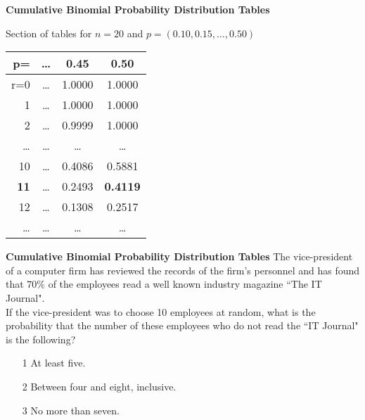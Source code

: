 \documentclass[a4]{beamer}
\begin{document}
{
\textbf{Cumulative Binomial Probability Distribution Tables}

Section of tables for $n=20$ and $p = (0.10,0.15, \ldots, 0.50)$
\begin{center}
\begin{tabular}{|r||c|c|c|}
  \hline
  p= & \ldots & 0.45 & \textbf{0.50} \\ \hline \hline
  r=0 & \ldots & 1.0000 & 1.0000 \\
  1 & \ldots & 1.0000 & 1.0000 \\
  2 & \ldots & 0.9999 & 1.0000 \\
  \ldots & \ldots & \ldots & \ldots \\

  10 & \ldots & 0.4086 & 0.5881 \\
  \textbf{11} & \ldots & 0.2493 & \alert{\textbf{0.4119}} \\
   12  & \ldots & 0.1308 & 0.2517 \\
  \ldots & \ldots & \ldots & \ldots \\
  \hline
\end{tabular}
\end{center}

}


{
\textbf{Cumulative Binomial Probability Distribution Tables}
The vice-president of a computer firm has reviewed the records of the firm's personnel and has found that 70\% of the employees read a well known industry magazine ``The IT Journal". \\ \bigskip
If the vice-president was to choose 10 employees at random, what is the probability that the number of these employees who do not read the ``IT Journal" is the following?
\normalsize
\begin{itemize}
\item [1] At least five.
\item [2] Between four and eight, inclusive.
\item [3] No more than seven.
\end{itemize}
}
\end{document}
